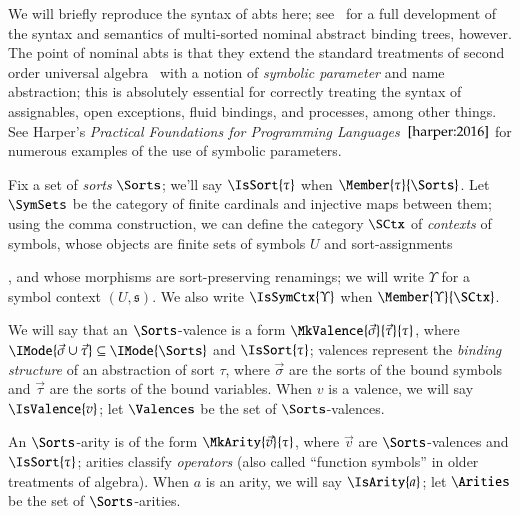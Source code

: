 \documentclass[11pt]{article}
\theoremstyle{definition}
\theoremstyle{notation}
\theoremstyle{remark}
\numberwithin{equation}{section}
\begin{document}
We will briefly reproduce the syntax of abts here;
see~\cite{sterling-morrison:2015} for a full development of the syntax and
semantics of multi-sorted nominal abstract binding trees, however. The point
of nominal abts is that they extend the standard treatments of second order
universal algebra~\cite{fiore-hur:2010} with a notion of \emph{symbolic
parameter} and name abstraction; this is absolutely essential for correctly
treating the syntax of assignables, open exceptions, fluid bindings, and
processes, among other things. See Harper's \emph{Practical Foundations for
Programming Languages}~$\cite{harper:2016}$ for numerous examples of the use of
symbolic parameters.

Fix a set of \emph{sorts} $\Sorts$; we'll say $\IsSort{\tau}$ when
$\Member{\tau}{\Sorts}$. Let $\SymSets$ be the category of finite cardinals and
injective maps between them; using the comma construction, we can define the
category $\SCtx$ of \emph{contexts} of symbols, whose objects are finite sets
of symbols $U$ and sort-assignments
, and whose morphisms are
sort-preserving renamings; we will write $\Upsilon$ for a symbol context
$(U,\mathfrak{s})$.  We also write $\IsSymCtx{\Upsilon}$ when $\Member{\Upsilon}{\SCtx}$.

We will say that an $\Sorts$-valence is a form
$\MkValence{\vec{\sigma}}{\vec{\tau}}{\tau}$, where
$\IMode{\vec{\sigma}\cup\vec{\tau}}\subseteq\IMode{\Sorts}$ and
$\IsSort{\tau}$; valences represent the \emph{binding structure} of an
abstraction of sort $\tau$, where $\vec{\sigma}$ are the sorts of the bound
symbols and $\vec{\tau}$ are the sorts of the bound variables. When $v$ is a
valence, we will say $\IsValence{v}$; let $\Valences$ be the set of $\Sorts$-valences.

An $\Sorts$-arity is of the form $\MkArity{\vec{v}}{\tau}$, where $\vec{v}$ are
$\Sorts$-valences and $\IsSort{\tau}$; arities classify \emph{operators} (also
called ``function symbols'' in older treatments of algebra). When $a$ is an
arity, we will say $\IsArity{a}$; let $\Arities$ be the set of $\Sorts$-arities.
\end{document}
